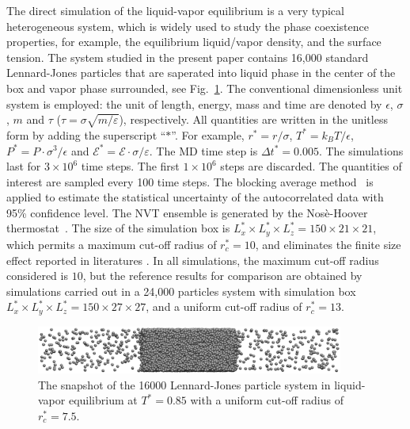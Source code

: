 \documentclass[aps,pre,preprint]{revtex4-1}
\begin{document}
The direct simulation of the liquid-vapor equilibrium is a very
typical heterogeneous system, which is widely used to study the phase
coexistence properties, for example, the equilibrium liquid/vapor
density, and the surface tension. The system studied in the present
paper contains 16,000 standard Lennard-Jones particles that are
saperated into liquid phase in the center of the box and vapor phase
surrounded, see Fig.~\ref{fig:tmp1}.  The conventional dimensionless
unit system is employed: the unit of length, energy, mass and time are
denoted by $\epsilon$, $\sigma$, $m$ and $\tau$ ($\tau =
\sigma\sqrt{m/\varepsilon}$), respectively.  All quantities are
written in the unitless form by adding the superscript ``$\ast$''.
For example, $r^\ast = r / \sigma$, $T^\ast = k_BT / \epsilon$,
$P^\ast = P\cdot \sigma^3 / \epsilon$ and $\mathcal E^\ast = \mathcal
E\cdot\sigma/\varepsilon$.  The MD time step {is} $\Delta t^\ast =
0.005$. The simulations last for $3\times 10^6$ time steps. The first
$1\times 10^6$ steps are discarded. The quantities of interest are
sampled every 100 time steps. The blocking average
method~\cite{flyvbjerg1989error} is applied to estimate the
statistical uncertainty of the autocorrelated data with 95\%
confidence level. The NVT ensemble is generated by the Nos\`e-Hoover
thermostat~\cite{nose1984molecular, hoover1985canonical}.  The size of
the simulation box is $L_x^\ast \times L_y^\ast \times L_z^\ast =
150\times 21\times 21$, which permits a maximum cut-off radius of
$r_c^\ast = 10$, and eliminates the finite size effect reported in
literatures \cite{chen1995area, orea2005oscillatory,
  biscay2009calculation}. In all simulations, the maximum cut-off
radius considered is $10$, but the reference results for comparison
are obtained by simulations carried out in a 24,000 particles system
with simulation box $L_x^\ast \times L_y^\ast \times L_z^\ast =
150\times 27\times 27$, and a uniform cut-off radius of $r_c^\ast =
13$.

\begin{figure}
  \centering
  \includegraphics[width=0.9\textwidth]{fig/t0.85-n16000-rc07.5uni/confout.eps}
  \caption{The snapshot of the 16000 Lennard-Jones particle system in
    liquid-vapor equilibrium at $T^\ast=0.85$ with a uniform cut-off
    radius of $r_c^\ast = 7.5$.}
  \label{fig:tmp1}
\end{figure}
\end{document}
